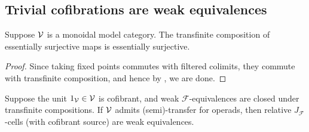 \documentclass[a4paper,10pt
,draft
]{article}%
\renewcommand{\F}{\mathcal F}
\renewcommand{\1}{\ensuremath{\mathbb{id}}}
\begin{document}
\subsection{Trivial cofibrations are weak equivalences}

\begin{lemma}
      \label{TRANSCOMP_ES_LEM}
      Suppose $\mathcal V$ is a monoidal model category.
      The transfinite composition of essentially surjective maps is essentially surjective.
\end{lemma}
\begin{proof}
      Since taking fixed points commutes with filtered colimits, they commute with transfinite composition,
      and hence by \cite[4.17]{Cav14}, we are done.
\end{proof}

\begin{lemma}
      \label{J-CELL_LEMMA}
      Suppose the unit $1_{\mathcal V} \in \mathcal V$ is cofibrant,
      and weak $\F$-equivalences are closed under transfinite compositions.
      If $\mathcal V$ admits (semi)-transfer for operads, then relative $J_{\F}$-cells (with cofibrant source) are weak equivalences.
\end{lemma}
\end{document}
